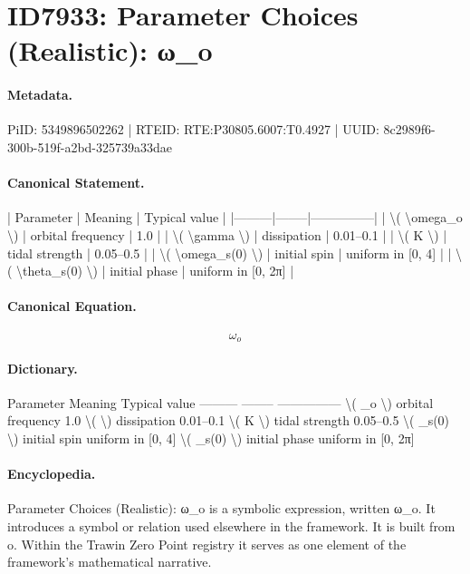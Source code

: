 \section*{ID7933: Parameter Choices (Realistic): ω\_o}
\paragraph{Metadata.}
PiID: 5349896502262 | RTEID: RTE:P30805.6007:T0.4927 | UUID: 8c2989f6-300b-519f-a2bd-325739a33dae

\paragraph{Canonical Statement.}
| Parameter | Meaning | Typical value | |---------|--------|---------------| | \textbackslash{}( \textbackslash{}omega\_o \textbackslash{}) | orbital frequency | 1.0 | | \textbackslash{}( \textbackslash{}gamma \textbackslash{}) | dissipation | 0.01–0.1 | | \textbackslash{}( K \textbackslash{}) | tidal strength | 0.05–0.5 | | \textbackslash{}( \textbackslash{}omega\_s(0) \textbackslash{}) | initial spin | uniform in [0, 4] | | \textbackslash{}( \textbackslash{}theta\_s(0) \textbackslash{}) | initial phase | uniform in [0, 2π] |

\paragraph{Canonical Equation.}
\[
\omega_o
\]

\paragraph{Dictionary.}
Parameter Meaning Typical value --------- -------- --------------- \textbackslash{}( \_o \textbackslash{}) orbital frequency 1.0 \textbackslash{}( \textbackslash{}) dissipation 0.01–0.1 \textbackslash{}( K \textbackslash{}) tidal strength 0.05–0.5 \textbackslash{}( \_s(0) \textbackslash{}) initial spin uniform in [0, 4] \textbackslash{}( \_s(0) \textbackslash{}) initial phase uniform in [0, 2π]

\paragraph{Encyclopedia.}
Parameter Choices (Realistic): ω\_o is a symbolic expression, written ω\_o. It introduces a symbol or relation used elsewhere in the framework. It is built from o. Within the Trawin Zero Point registry it serves as one element of the framework's mathematical narrative.
